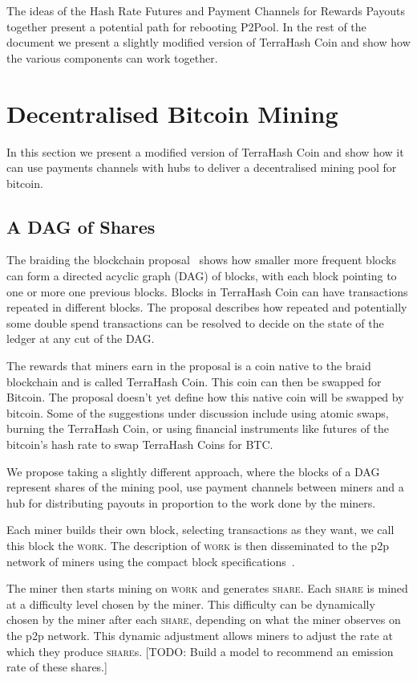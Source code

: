 \documentclass{article}
\begin{document}
The ideas of the Hash Rate Futures and Payment Channels for Rewards
Payouts together present a potential path for rebooting P2Pool. In the
rest of the document we present a slightly modified version of
TerraHash Coin and show how the various components can work together.

\section{Decentralised Bitcoin Mining}

In this section we present a modified version of TerraHash Coin and
show how it can use payments channels with hubs to deliver a
decentralised mining pool for bitcoin.

\subsection{A DAG of Shares}

The braiding the blockchain proposal~\cite{mcelrath:variance} shows
how smaller more frequent blocks can form a directed acyclic graph
(DAG) of blocks, with each block pointing to one or more one previous
blocks. Blocks in TerraHash Coin can have transactions repeated in
different blocks. The proposal describes how repeated and potentially
some double spend transactions can be resolved to decide on the state
of the ledger at any cut of the DAG.\@

The rewards that miners earn in the proposal is a coin native to the
braid blockchain and is called TerraHash Coin. This coin can then be
swapped for Bitcoin. The proposal doesn't yet define how this native
coin will be swapped by bitcoin. Some of the suggestions under
discussion include using atomic swaps, burning the TerraHash Coin, or
using financial instruments like futures of the bitcoin's hash
rate to swap TerraHash Coins for BTC.\@

We propose taking a slightly different approach, where the blocks of a
DAG represent shares of the mining pool, use payment channels between
miners and a hub for distributing payouts in proportion to the work done
by the miners.

Each miner builds their own block, selecting transactions as they
want, we call this block the \textsc{work}. The description of
\textsc{work} is then disseminated to the p2p network of miners using
the compact block specifications~\cite{compact-blocks}.

The miner then starts mining on \textsc{work} and generates
\textsc{share}. Each \textsc{share} is mined at a difficulty level
chosen by the miner. This difficulty can be dynamically chosen by the
miner after each \textsc{share}, depending on what the miner observes
on the p2p network. This dynamic adjustment allows miners to adjust
the rate at which they produce \textsc{share}s. [TODO: Build a model to
recommend an emission rate of these shares.]
\end{document}
